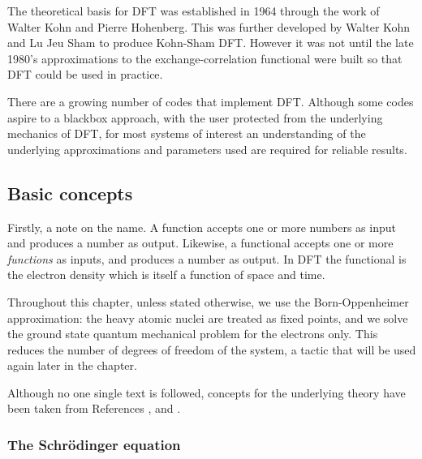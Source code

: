 The theoretical basis for DFT was established in 1964 through the work of Walter Kohn and Pierre Hohenberg.\autocite{Hohenberg1964} This was further developed by Walter Kohn and Lu Jeu Sham to produce Kohn-Sham DFT.\autocite{Kohn1965} However it was not until the late 1980's approximations to the exchange-correlation functional were built so that DFT could be used in practice. 

There are a growing number of codes that implement DFT. 
Although some codes aspire to a blackbox approach, with the user protected from the underlying mechanics of DFT, for most systems of interest an understanding of the underlying approximations and parameters used are required for reliable results.

\subsection{Basic concepts} %

Firstly, a note on the name. A function accepts one or more numbers as input and produces a number as output. Likewise, a functional accepts one or more \textit{functions} as inputs, and produces a number as output. In DFT the functional is the electron density which is itself a function of space and time.

Throughout this chapter, unless stated otherwise, we use the Born-Oppenheimer approximation: the heavy atomic nuclei are treated as fixed points, and we solve the ground state quantum mechanical problem for the electrons only. This reduces the number of degrees of freedom of the system, a tactic that will be used again later in the chapter.

Although no one single text is followed, concepts for the underlying theory have been taken from References \cite{Burke2007}, \cite{Scuseria05} and \cite{Perdew2010}.


\subsubsection{The Schr\"{o}dinger equation}

